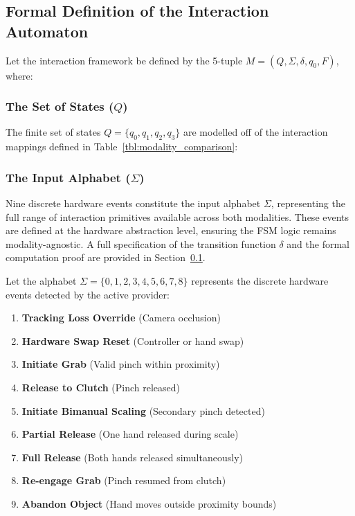 \subsection{Formal Definition of the Interaction Automaton}
\label{sec:fsm_definition}

Let the interaction framework be defined by the 5-tuple $M = (Q, \Sigma, \delta, q_0, F)$, where:

\subsubsection{The Set of States ($Q$)}
\label{sec:fsm_states}
The finite set of states $Q = \{q_0, q_1, q_2, q_3\}$ are modelled off of the interaction mappings defined in Table~\ref{tbl:modality_comparison}:

\subsubsection{The Input Alphabet ($\Sigma$)}
\label{sec:fsm_alphabet}
Nine discrete hardware events constitute the input alphabet $\Sigma$, representing the full range of interaction primitives available across both modalities. These events are defined at the hardware abstraction level, ensuring the FSM logic remains modality-agnostic. A full specification of the transition function $\delta$ and the formal computation proof are provided in Section~\ref{sec:fsm_definition}.

Let the alphabet $\Sigma = \{0, 1, 2, 3, 4, 5, 6, 7, 8\}$ represents the discrete hardware events detected by the active provider:
\begin{enumerate}[nosep, label=${\arabic*}$:, start=0]
    \item \textbf{Tracking Loss Override} (Camera occlusion)
    \item \textbf{Hardware Swap Reset} (Controller or hand swap)
    \item \textbf{Initiate Grab} (Valid pinch within proximity)
    \item \textbf{Release to Clutch} (Pinch released)
    \item \textbf{Initiate Bimanual Scaling} (Secondary pinch detected)
    \item \textbf{Partial Release} (One hand released during scale)
    \item \textbf{Full Release} (Both hands released simultaneously)
    \item \textbf{Re-engage Grab} (Pinch resumed from clutch)
    \item \textbf{Abandon Object} (Hand moves outside proximity bounds)
\end{enumerate}

